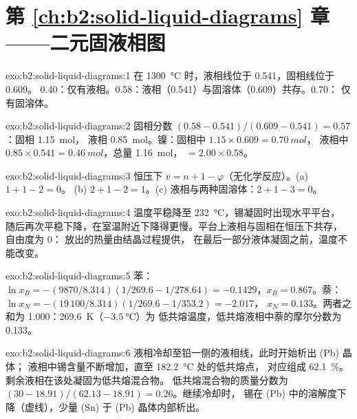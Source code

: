 \section*{第 \ref{ch:b2:solid-liquid-diagrams} 章——二元固液相图}

\begin{solution}{exo:b2:solid-liquid-diagrams:1}
在 \qty{1300}{\degreeCelsius} 时，液相线位于 0.541，固相线位于 0.609。
0.40：仅有液相。0.58：液相（0.541）与固溶体（0.609）共存。0.70：
仅有固溶体。
\end{solution}

\begin{solution}{exo:b2:solid-liquid-diagrams:2}
固相分数 $(0.58 - 0.541)/(0.609 - 0.541) = 0.57$：固相 \qty{1.15}{mol}，
液相 \qty{0.85}{mol}。镍：固相中 $1.15 \times 0.609 = \qty{0.70}{mol}$，
液相中 $0.85 \times 0.541 = \qty{0.46}{mol}$，总量 \qty{1.16}{mol}，
$= 2.00 \times 0.58$。
\end{solution}

\begin{solution}{exo:b2:solid-liquid-diagrams:3}
恒压下 $v = n + 1 - \varphi$（无化学反应）。(a) $1 + 1 - 2 = 0$。
(b) $2 + 1 - 2 = 1$。(c) 液相与两种固溶体：$2 + 1 - 3 = 0$。
\end{solution}

\begin{solution}{exo:b2:solid-liquid-diagrams:4}
温度平稳降至 \qty{232}{\degreeCelsius}，锡凝固时出现水平平台，
随后再次平稳下降，在室温附近下降得更慢。平台上液相与固相在恒压下共存，
自由度为 0：
放出的热量由结晶过程提供，
在最后一部分液体凝固之前，温度不能改变。
\end{solution}

\begin{solution}{exo:b2:solid-liquid-diagrams:5}
苯：$\ln x_B = -(9870/8.314)(1/269.6 - 1/278.64) = -0.1429$，$x_B =
0.867$。萘：$\ln x_N = -(19\,100/8.314)(1/269.6 - 1/353.2) = -2.017$，
$x_N = 0.133$。两者之和为 1.000：\qty{269.6}{K}（$\qty{-3.5}{\degreeCelsius}$）为
低共熔温度，低共熔液相中萘的摩尔分数为 0.133。
\end{solution}

\begin{solution}{exo:b2:solid-liquid-diagrams:6}
液相冷却至铅一侧的液相线，此时开始析出 (Pb) 晶体；
液相中锡含量不断增加，直至 \qty{182.2}{\degreeCelsius} 处的低共熔点，
对应组成 62.1~\%。剩余液相在该处凝固为低共熔混合物。
低共熔混合物的质量分数为 $(30 - 18.91)/(62.13 - 18.91) = 0.26$。继续冷却时，
锡在 (Pb) 中的溶解度下降（虚线），少量 (Sn)
于 (Pb) 晶体内部析出。
\end{solution}

